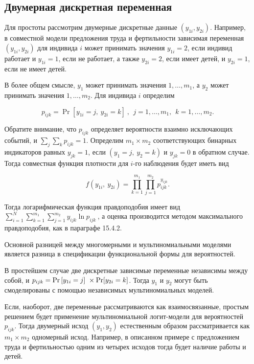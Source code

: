 \subsection{ Двумерная дискретная переменная}

Для простоты рассмотрим двумерные дискретные данные $(y_{1i},y_{2i})$. Например, в совместной модели предложения труда и фертильности зависимая переменная $(y_{1i},y_{2i})$ для индивида $i$ может принимать значения $y_{1i}=2$, если индивид работает и $y_{1i}=1$, если не работает, а также $y_{2i}=2$, если имеет детей, и $y_{2i}=1$, если не имеет детей.

В более общем смысле, $y_1$ может принимать значения $1,\dots ,m_1$, а $y_2$ может принимать значения $1,\dots ,m_2$. Для индивида $i$ определим

\begin{equation} \label{GrindEQ__15_50_} p_{ijk}={\Pr  \left[y_{1i}=j,\ y_{2i}=k\right]\ },\ \ j=1,\dots ,m_1,\ \ k=1,\dots ,m_2. \end{equation} 

Обратите внимание, что $p_{ijk}$ определяет вероятности взаимно исключающих событий, и $\sum_j{\sum_k{p_{ijk}=1}}$. Определим $m_1\times m_2$ соответствующих бинарных индикаторов равных $y_{jk}=1$, если $(y_1=j,\ y_2=k)$ и $y_{jk}=0$ в обратном случае. Тогда совместная функция плотности для $i$-го наблюдения будет иметь вид

\[f\left(y_{1i},\ y_{2i}\right)=\prod^{m_1}_{k=1}{\prod^{m_2}_{j=1}{p^{y_{ijk}}_{ijk}}}.\] 

Тогда логарифмическая функция правдоподобия имеет вид $\sum^N_{i=1}{\sum^{m_1}_{k=1}{\sum^{m_2}_{j=1}{y_{ijk}{\ln  p_{ijk}\ }}}}$, а оценка производится методом максимального правдоподобия, как в параграфе 15.4.2.

Основной разницей между многомерными и мультиномиальными моделями является разница в спецификации функциональной формы для вероятностей.

В простейшем случае две дискретные зависимые переменные независимы между собой, и $p_{ijk}={\Pr  \left[y_{1i}=j\right]\ }\times {\rm Pr}[y_{2i}=k]$. Тогда $y_1$ и $y_2$ могут быть смоделированы с помощью независимых мультиномиальных моделей.

Если, наоборот, две переменные рассматриваются как взаимосвязанные, простым решением будет применение мультиномиальной логит-модели для вероятностей $p_{ijk}$. Тогда двумерный исход $(y_1,y_2)$ естественным образом рассматривается как $m_1\times m_2$ одномерный исход. Например, в описанном примере с предложением труда и фертильностью одним из четырех исходов тогда будет наличие работы и детей.

